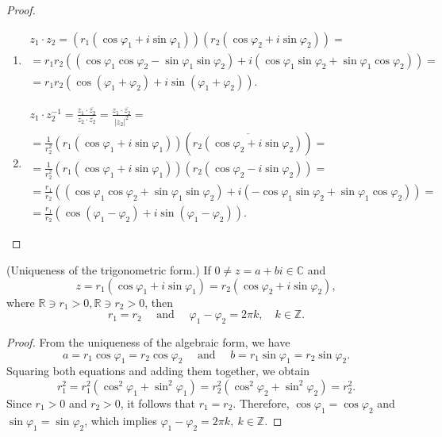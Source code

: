 \begin{proof}
\begin{enumerate}
\item
\begin{gather*}
z_1 \cdot z_2 =\left(r_1\left(\cos \varphi_1+i \sin \varphi_1\right)\right)\left(r_2\left(\cos \varphi_2+i \sin \varphi_2\right)\right) =\\
=r_1r_2\left((\cos \varphi_1 \cos \varphi_2-\sin \varphi_1 \sin \varphi_2)+i(\cos \varphi_1 \sin \varphi_2+\sin \varphi_1 \cos \varphi_2)\right) = \\ =r_1r_2\left(\cos \left(\varphi_1+\varphi_2\right)+i \sin \left(\varphi_1+\varphi_2\right)\right).
\end{gather*}
\item
\begin{gather*}
z_1 \cdot z_2^{-1}=\frac{z_1\cdot \overline{z_2}}{z_2\cdot\overline{z_2}} =\frac{z_1 \cdot \overline{z_2}}{|z_2|^2} = \\ =\frac{1}{r_2^2}\left(r_1\left(\cos \varphi_1+i \sin \varphi_1\right)\right)\left(\overline{r_2\left(\cos \varphi_2+i \sin \varphi_2\right)}\right) = \\ =\frac{1}{r_2^2}\left(r_1\left(\cos \varphi_1+i \sin \varphi_1\right)\right)\left(r_2\left(\cos \varphi_2-i \sin \varphi_2\right)\right) = \\ =\frac{r_1}{r_2}\left((\cos \varphi_1 \cos \varphi_2+\sin \varphi_1 \sin \varphi_2)+i(-\cos \varphi_1 \sin \varphi_2+\sin \varphi_1 \cos \varphi_2)\right) = \\=\frac{r_1}{r_2}\left(\cos \left(\varphi_1-\varphi_2\right)+i \sin \left(\varphi_1-\varphi_2\right)\right) .
\end{gather*}
\end{enumerate}
\end{proof}

\begin{theorem}(Uniqueness of the trigonometric form.) If $0 \neq z=a+b i \in \mathbb{C}$ and
$$
z=r_1\left(\cos \varphi_1+i \sin \varphi_1\right)=r_2\left(\cos \varphi_2+i \sin \varphi_2\right),
$$
where $\mathbb{R} \ni r_1>0, \mathbb{R} \ni r_2>0$, then
$$
r_1=r_2 \quad \text { and } \quad \varphi_1-\varphi_2=2 \pi k, \quad k \in \mathbb{Z} .
$$
\end{theorem}

\begin{proof}
From the uniqueness of the algebraic form, we have
$$
a=r_1 \cos \varphi_1=r_2 \cos \varphi_2 \quad \text { and } \quad b=r_1 \sin \varphi_1=r_2 \sin \varphi_2 .
$$
Squaring both equations and adding them together, we obtain
$$
r_1^2=r_1^2\left(\cos ^2 \varphi_1+\sin ^2 \varphi_1\right)=r_2^2\left(\cos ^2 \varphi_2+\sin ^2 \varphi_2\right)=r_2^2 .
$$
Since $r_1>0$ and $r_2>0$, it follows that $r_1=r_2$. Therefore, $\cos \varphi_1=\cos \varphi_2$ and $\sin \varphi_1=\sin \varphi_2$, which implies $\varphi_1-\varphi_2=2 \pi k,~k \in \mathbb{Z}$.

\end{proof}

